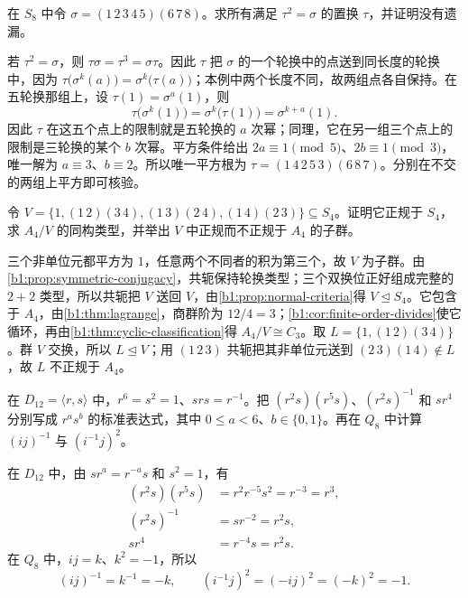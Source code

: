 \begin{exercise}\label{b1:ex:03-permutation-root}
	在 \(S_8\) 中令 \(\sigma=(1\,2\,3\,4\,5)(6\,7\,8)\)。求所有满足 \(\tau^2=\sigma\) 的置换 \(\tau\)，并证明没有遗漏。
\end{exercise}
\begin{solution}
	若 \(\tau^2=\sigma\)，则 \(\tau\sigma=\tau^3=\sigma\tau\)。因此 \(\tau\) 把 \(\sigma\) 的一个轮换中的点送到同长度的轮换中，因为 \(\tau\bigl(\sigma^k(a)\bigr)=\sigma^k\bigl(\tau(a)\bigr)\)；本例中两个长度不同，故两组点各自保持。在五轮换那组上，设 \(\tau(1)=\sigma^a(1)\)，则
	\[
		\tau\bigl(\sigma^k(1)\bigr) =\sigma^k\bigl(\tau(1)\bigr) =\sigma^{k+a}(1).
	\]
	因此 \(\tau\) 在这五个点上的限制就是五轮换的 \(a\) 次幂；同理，它在另一组三个点上的限制是三轮换的某个 \(b\) 次幂。平方条件给出 \(2a\equiv1\pmod5\)、\(2b\equiv1\pmod3\)，唯一解为 \(a\equiv3\)、\(b\equiv2\)。所以唯一平方根为 \(\tau=(1\,4\,2\,5\,3)(6\,8\,7)\)。分别在不交的两组上平方即可核验。
\end{solution}

\begin{exercise}\label{b1:ex:03-klein-four}
	令 \(V=\bigl\{1,(1\,2)(3\,4),(1\,3)(2\,4),(1\,4)(2\,3)\bigr\}\subseteq S_4\)。证明它正规于 \(S_4\)，求 \(A_4/V\) 的同构类型，并举出 \(V\) 中正规而不正规于 \(A_4\) 的子群。
\end{exercise}
\begin{solution}
	三个非单位元都平方为 \(1\)，任意两个不同者的积为第三个，故 \(V\) 为子群。由\cref{b1:prop:symmetric-conjugacy}，共轭保持轮换类型；三个双换位正好组成完整的 \(2+2\) 类型，所以共轭把 \(V\) 送回 \(V\)，由\cref{b1:prop:normal-criteria}得 \(V\trianglelefteq S_4\)。它包含于 \(A_4\)，由\cref{b1:thm:lagrange}，商群阶为 \(12/4=3\)；\cref{b1:cor:finite-order-divides}使它循环，再由\cref{b1:thm:cyclic-classification}得 \(A_4/V\cong C_3\)。取 \(L=\bigl\{1,(1\,2)(3\,4)\bigr\}\)。群 \(V\) 交换，所以 \(L\trianglelefteq V\)；用 \((1\,2\,3)\) 共轭把其非单位元送到 \((2\,3)(1\,4)\notin L\)，故 \(L\) 不正规于 \(A_4\)。
\end{solution}

\begin{exercise}\label{b1:ex:03-dihedral-quaternion-calculation}
	在 \(D_{12}=\langle r,s\rangle\) 中，\(r^6=s^2=1\)、\(srs=r^{-1}\)。把 \((r^2s)(r^5s)\)、\((r^2s)^{-1}\) 和 \(sr^4\) 分别写成 \(r^as^b\) 的标准表达式，其中 \(0\leq a<6\)、\(b\in\{0,1\}\)。再在 \(Q_8\) 中计算 \((ij)^{-1}\) 与 \((i^{-1}j)^2\)。
\end{exercise}
\begin{solution}
	在 \(D_{12}\) 中，由 \(sr^a=r^{-a}s\) 和 \(s^2=1\)，有
	\[
		\begin{aligned}
			(r^2s)(r^5s)&=r^2r^{-5}s^2=r^{-3}=r^3,\\
			(r^2s)^{-1}&=sr^{-2}=r^2s,\\
			sr^4&=r^{-4}s=r^2s.
		\end{aligned}
	\]
	在 \(Q_8\) 中，\(ij=k\)、\(k^2=-1\)，所以
	\[
		(ij)^{-1}=k^{-1}=-k, \qquad (i^{-1}j)^2=(-ij)^2=(-k)^2=-1.
	\]
\end{solution}

